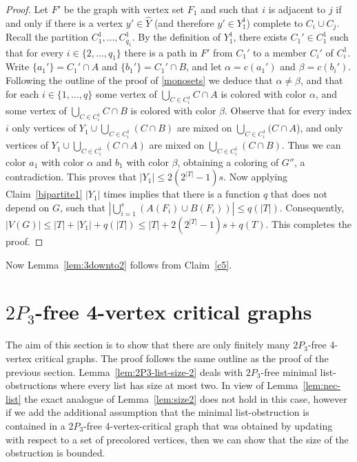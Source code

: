 \documentclass[11pt]{article}
\begin{document}
\begin{proof}
Let $F'$ be the graph with vertex set $F_1$ and such that $i$ is adjacent to $j$
if and only if there is a vertex $y' \in \hat{Y}$ (and therefore $y' \in Y_1^1$)
complete to $C_i \cup C_j$. Recall the partition $C_1^1, \ldots, C_{q_1}^1$.
By the definition of $Y_1^1$, there exists $C_1' \in C_1^1$ such that for every $i \in \{2, \ldots, q_1\}$ there is a path in $F'$ from $C_1'$ to a member $C_i'$ of $C_i^1$. Write $\{a_1'\}=C_1' \cap A$ and $\{b_1'\}=C_1' \cap B$, and let $\alpha=c(a_1')$ and $\beta=c(b_i')$.
Following the outline of the proof of \eqref{monosets} we deduce that $\alpha \neq \beta$, and that for each $i \in \{1, \ldots, q\}$ some vertex of $\bigcup_{C \in C_i^1} C \cap A$ is colored with color $\alpha$, and some vertex of $\bigcup_{C \in C_i^1} C \cap B$ is colored with color $\beta$.
Observe that for every index $i$ only vertices of $Y_1 \cup \bigcup_{C \in C_i^1} (C \cap B)$ are mixed on $\bigcup_{C \in C_i^1} (C \cap A$), and only vertices of $Y_1 \cup \bigcup_{C \in C_i^1} (C \cap A)$ are mixed on $\bigcup_{C \in C_i^1} (C \cap B)$.
Thus we can color $a_1$ with color $\alpha$ and $b_1$ with color $\beta$, obtaining a coloring of $G''$, a contradiction. 
This proves that $|Y_1| \leq  2(2^{|T|}-1)s$.
Now applying Claim~\ref{bipartite1} $|Y_1|$ times implies that there is a function $q$ that does not depend on $G$, such that 
$|\bigcup_{i=1}^s (A(F_i) \cup B(F_i))| \leq q(|T|)$.
Consequently,  $|V(G)| \leq |T| + |Y_1| + q(|T|) \leq |T| + 2(2^{|T|}-1)s+q(T)$.
This completes the proof. 
\end{proof}

Now Lemma~\ref{lem:3downto2} follows from Claim~\ref{c5}.

\section{$2P_3$-free 4-vertex critical graphs}\label{sec:sufficiency-2P3}

The aim of this section is to show that there are only finitely many $2P_3$-free 4-vertex critical graphs. The proof follows the same  outline as the proof of the  previous section.
Lemma~\ref{lem:2P3-list-size-2} deals with  $2P_3$-free minimal list-obstructions where every list has size at most two. In view of Lemma~\ref{lem:nec-list} 
the exact analogue of Lemma~\ref{lem:size2}
does not hold in this case, 
however if we add the additional assumption that the minimal list-obstruction is contained in a $2P_3$-free 4-vertex-critical graph that  was obtained by updating with respect to a set of precolored vertices, then we can show that the size of the obstruction  is bounded.
\end{document}
